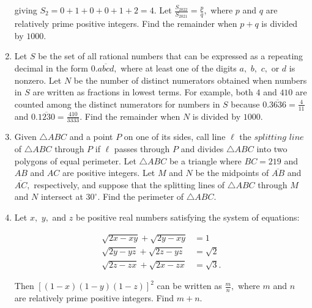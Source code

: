 \documentclass{article}
\begin{document}
\begin{enumerate}[label=\arabic*., itemsep=0.5em]
 giving \(S_2 = 0+1+0+0+1+2=4.\) Let \(\frac{S_{2022}}{S_{2021}} = \frac{p}{q},\) where \(p\) and \(q\) are relatively prime positive integers. Find the remainder when \(p+q\) is divided by \(1000.\)\par \vspace{0.5em}\item Let \(S\) be the set of all rational numbers that can be expressed as a repeating decimal in the form \(0.\overline{abcd},\) where at least one of the digits \(a,\) \(b,\) \(c,\) or \(d\) is nonzero. Let \(N\) be the number of distinct numerators obtained when numbers in \(S\) are written as fractions in lowest terms. For example, both \(4\) and \(410\) are counted among the distinct numerators for numbers in \(S\) because \(0.\overline{3636} = \frac{4}{11}\) and \(0.\overline{1230} = \frac{410}{3333}.\) Find the remainder when \(N\) is divided by \(1000.\)\par \vspace{0.5em}\item Given \(\triangle ABC\) and a point \(P\) on one of its sides, call line \(\ell\) the \(\textit{splitting line}\) of \(\triangle ABC\) through \(P\) if \(\ell\) passes through \(P\) and divides \(\triangle ABC\) into two polygons of equal perimeter. Let \(\triangle ABC\) be a triangle where \(BC = 219\) and \(AB\) and \(AC\) are positive integers. Let \(M\) and \(N\) be the midpoints of \(\overline{AB}\) and \(\overline{AC},\) respectively, and suppose that the splitting lines of \(\triangle ABC\) through \(M\) and \(N\) intersect at \(30^\circ.\) Find the perimeter of \(\triangle ABC.\)\par \vspace{0.5em}\item Let \(x,\) \(y,\) and \(z\) be positive real numbers satisfying the system of equations:

\begin{align*}
\sqrt{2x-xy} + \sqrt{2y-xy} &= 1 \\
\sqrt{2y-yz} + \sqrt{2z-yz} &= \sqrt2 \\
\sqrt{2z-zx} + \sqrt{2x-zx} &= \sqrt3.
\end{align*}
 
Then \(\left[ (1-x)(1-y)(1-z) \right]^2\) can be written as \(\frac{m}{n},\) where \(m\) and \(n\) are relatively prime positive integers. Find \(m+n.\)\par \vspace{0.5em}
\end{enumerate}
\end{document}

